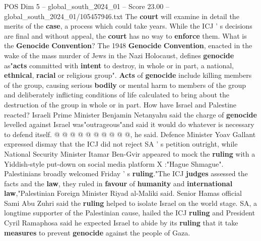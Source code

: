 \begin{textsample}{POS Dim 5 – global\_south\_2024\_01 – Score 23.00 – global\_south\_2024\_01/105457946.txt}
The \textbf{court} will examine in detail the merits of the \textbf{case}, a process which could take years.
While the ICJ ' s decisions are final and without appeal, the \textbf{court} has no way to \textbf{enforce} them.
What is the \textbf{Genocide} \textbf{Convention}?
The 1948 \textbf{Genocide} \textbf{Convention}, enacted in the wake of the mass murder of Jews in the Nazi Holocaust, defines \textbf{genocide} as"\textbf{acts} committed with \textbf{intent} to destroy, in whole or in part, a national, \textbf{ethnical}, \textbf{racial} or religious group". \textbf{Acts} of \textbf{genocide} include killing members of the group, causing serious \textbf{bodily} or mental harm to members of the group and deliberately inflicting conditions of life calculated to bring about the destruction of the group in whole or in part.
How have Israel and Palestine reacted?
Israeli Prime Minister Benjamin Netanyahu said the charge of \textbf{genocide} levelled against Israel was"outrageous"and said it would do whatever is necessary to defend itself. @ @ @ @ @ @ @ @ @ @, he said.
Defence Minister Yoav Gallant expressed dismay that the ICJ did not reject SA ' s petition outright, while National Security Minister Itamar Ben-Gvir appeared to mock the \textbf{ruling} with a Yiddish-style put-down on social media platform X :"Hague Shmague".
Palestinians broadly welcomed Friday ' s \textbf{ruling}."The ICJ \textbf{judges} assessed the facts and the \textbf{law}, they ruled in \textbf{favour} of \textbf{humanity} and \textbf{international} \textbf{law},"Palestinian Foreign Minister Riyad al-Maliki said.
Senior Hamas official Sami Abu Zuhri said the \textbf{ruling} helped to isolate Israel on the world stage.
SA, a longtime supporter of the Palestinian cause, hailed the ICJ \textbf{ruling} and President Cyril Ramaphosa said he expected Israel to abide by its \textbf{ruling} that it take \textbf{measures} to prevent \textbf{genocide} against the people of Gaza.

\end{textsample}
